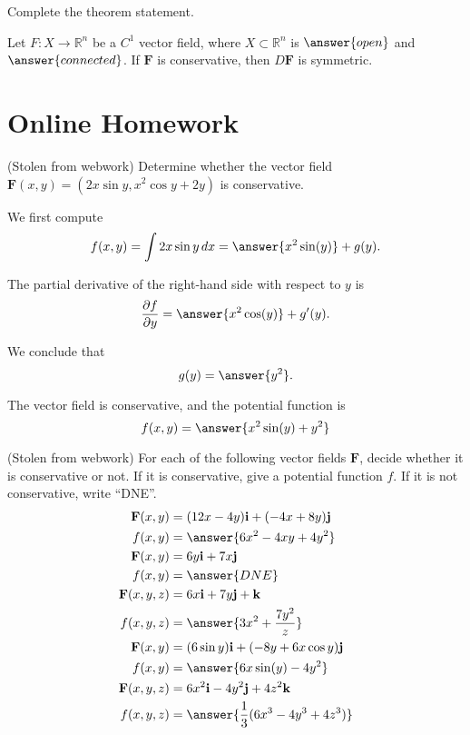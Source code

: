 \documentclass{ximera}
\begin{document}
\begin{problem}
Complete the theorem statement.

Let $F:X\rightarrow\mathbb{R}^n$ be a $C^1$ vector field, where $X\subset\mathbb{R}^n$ is $\answer{open}$ and $\answer{connected}$. If $\mathbf{F}$ is conservative, then $D\mathbf{F}$ is symmetric.
\end{problem}

\section{Online Homework}

\begin{problem}
(Stolen from webwork) Determine whether the vector field $\mathbf{F}(x,y) = (2x\sin y,x^2\cos y + 2y)$ is conservative.

We first compute 
\[
f(x,y)=\int 2x\sin y\, dx = \answer{x^2\sin(y)}+g(y).
\]
\begin{problem}
The partial derivative of the right-hand side with respect to $y$ is
\[
\frac{\partial f}{\partial y} = \answer{x^2\cos(y)}+g'(y).
\]
\begin{problem}
We conclude that
\[
g(y) = \answer{y^2}.
\]
\begin{problem}
The vector field is conservative, and the potential function is
\[
f(x,y) = \answer{x^2\sin(y)+y^2}
\]
\end{problem}
\end{problem}
\end{problem}
\end{problem}

\begin{problem}
(Stolen from webwork) For each of the following vector fields $\mathbf{F}$, decide whether it is conservative or not. If it is conservative, give a potential function $f$. If it is not conservative, write ``DNE''.
\begin{align*}
\mathbf{F}(x,y) &= (12x-4y)\mathbf{i} + (-4x+8y)\mathbf{j}\\
f(x,y) &=  \answer{6x^2-4xy+4y^2}\\
\mathbf{F}(x,y) &= 6y\mathbf{i} + 7x\mathbf{j}\\
f(x,y) &= \answer{DNE}\\
\mathbf{F}(x,y,z) &= 6x\mathbf{i} + 7y\mathbf{j} + \mathbf{k}\\
f(x,y,z) &= \answer{3x^2+\frac{7y^2}{z}}\\
\mathbf{F}(x,y) &=(6\sin y)\mathbf{i} + (-8y+6x\cos y)\mathbf{j}\\
f(x,y) &= \answer{6x\sin(y)-4y^2}\\
\mathbf{F}(x,y,z) &= 6x^2\mathbf{i}-4y^2\mathbf{j}+4z^2\mathbf{k}\\
f(x,y,z) &= \answer{\frac{1}{3}(6x^3-4y^3+4z^3)}
\end{align*}
\end{problem}
\end{document}
